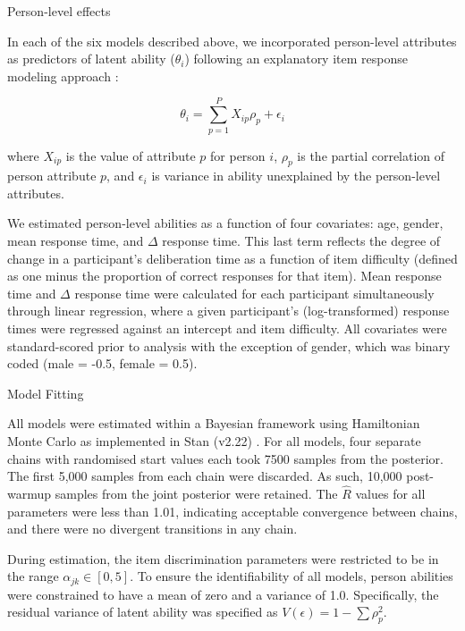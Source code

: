 \documentclass[a4paper,man,natbib]{apa6}
\makeatletter
\renewcommand{\subsubsection}{\@startsection{subsubsection}{3}
  {\z@}%
  {\b@level@two@skip}{\e@level@two@skip}%
  {\normalfont\normalsize\bfseries}}
\makeatother
\begin{document}
\subsubsection{Person-level effects}

In each of the six models described above, we incorporated person-level attributes as predictors of latent ability ($\theta_i$) following an explanatory item response modeling approach \citep{wilson2008explanatory}: 

\begin{equation} \label{eq:4}
\theta_i = \sum_{p=1}^P X_{ip} \rho_p + \epsilon_i    
\end{equation}

\noindent where $X_{ip}$ is the value of attribute $p$ for person $i$, $\rho_p$ is the partial correlation of person attribute $p$, and $\epsilon_i$ is variance in ability unexplained by the person-level attributes. 

We estimated person-level abilities as a function of four covariates: age, gender, mean response time, and $\Delta$ response time. This last term reflects the degree of change in a participant's deliberation time as a function of item difficulty (defined as one minus the proportion of correct responses for that item). Mean response time and $\Delta$ response time were calculated for each participant simultaneously through linear regression, where a given participant's (log-transformed) response times were regressed against an intercept and item difficulty. All covariates were standard-scored prior to analysis with the exception of gender, which was binary coded (male = -0.5, female = 0.5).

\subsubsection{Model Fitting}

All models were estimated within a Bayesian framework using Hamiltonian Monte Carlo as implemented in Stan (v2.22) \citep{carpenter2017stan}. For all models, four separate chains with randomised start values each took 7500 samples from the posterior. The first 5,000 samples from each chain were discarded. As such, 10,000 post-warmup samples from the joint posterior were retained. The $\hat{R}$ values for all parameters were less than 1.01, indicating acceptable convergence between chains, and there were no divergent transitions in any chain. 

During estimation, the item discrimination parameters were restricted to be in the range $\alpha_{jk} \in [0, 5]$. To ensure the identifiability of all models, person abilities were constrained to have a mean of zero and a variance of 1.0. Specifically, the residual variance of latent ability was specified as $V(\epsilon) = 1 - \sum \rho_p^2$.
\end{document}
